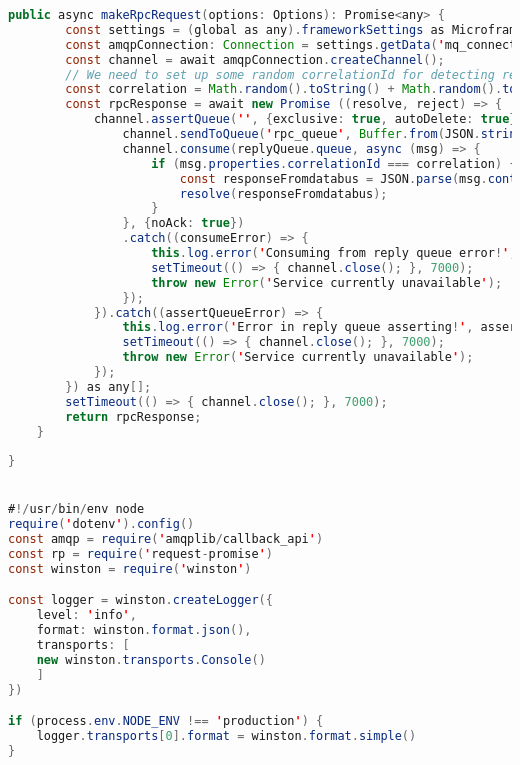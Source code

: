 \begin{lstlisting}[language=java]
	public async makeRpcRequest(options: Options): Promise<any> {
		const settings = (global as any).frameworkSettings as MicroframeworkSettings;
		const amqpConnection: Connection = settings.getData('mq_connection');
		const channel = await amqpConnection.createChannel();
		// We need to set up some random correlationId for detecting requests from concrete users
		const correlation = Math.random().toString() + Math.random().toString() + Math.random().toString();
		const rpcResponse = await new Promise ((resolve, reject) => {
			channel.assertQueue('', {exclusive: true, autoDelete: true}).then(replyQueue => {
				channel.sendToQueue('rpc_queue', Buffer.from(JSON.stringify(options)), { correlationId: correlation, replyTo: replyQueue.queue });
				channel.consume(replyQueue.queue, async (msg) => {
					if (msg.properties.correlationId === correlation) {
						const responseFromdatabus = JSON.parse(msg.content.toString());
						resolve(responseFromdatabus);
					}
				}, {noAck: true})
				.catch((consumeError) => {
					this.log.error('Consuming from reply queue error!', consumeError);
					setTimeout(() => { channel.close(); }, 7000);
					throw new Error('Service currently unavailable');
				});
			}).catch((assertQueueError) => {
				this.log.error('Error in reply queue asserting!', assertQueueError);
				setTimeout(() => { channel.close(); }, 7000);
				throw new Error('Service currently unavailable');
			});
		}) as any[];
		setTimeout(() => { channel.close(); }, 7000);
		return rpcResponse;
	}
	
}


#!/usr/bin/env node
require('dotenv').config()
const amqp = require('amqplib/callback_api')
const rp = require('request-promise')
const winston = require('winston')

const logger = winston.createLogger({
	level: 'info',
	format: winston.format.json(),
	transports: [
	new winston.transports.Console()
	]
})

if (process.env.NODE_ENV !== 'production') {
	logger.transports[0].format = winston.format.simple()
}


\end{lstlisting}
